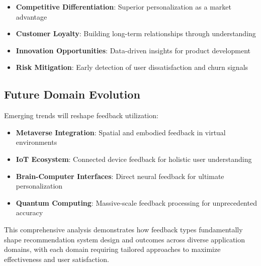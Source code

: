 \begin{itemize}
    \item \textbf{Competitive Differentiation}: Superior personalization as a market advantage
    \item \textbf{Customer Loyalty}: Building long-term relationships through understanding
    \item \textbf{Innovation Opportunities}: Data-driven insights for product development
    \item \textbf{Risk Mitigation}: Early detection of user dissatisfaction and churn signals
\end{itemize}

\subsection{Future Domain Evolution}

Emerging trends will reshape feedback utilization:

\begin{itemize}
    \item \textbf{Metaverse Integration}: Spatial and embodied feedback in virtual environments
    \item \textbf{IoT Ecosystem}: Connected device feedback for holistic user understanding
    \item \textbf{Brain-Computer Interfaces}: Direct neural feedback for ultimate personalization
    \item \textbf{Quantum Computing}: Massive-scale feedback processing for unprecedented accuracy
\end{itemize}

This comprehensive analysis demonstrates how feedback types fundamentally shape recommendation system design and outcomes across diverse application domains, with each domain requiring tailored approaches to maximize effectiveness and user satisfaction.

